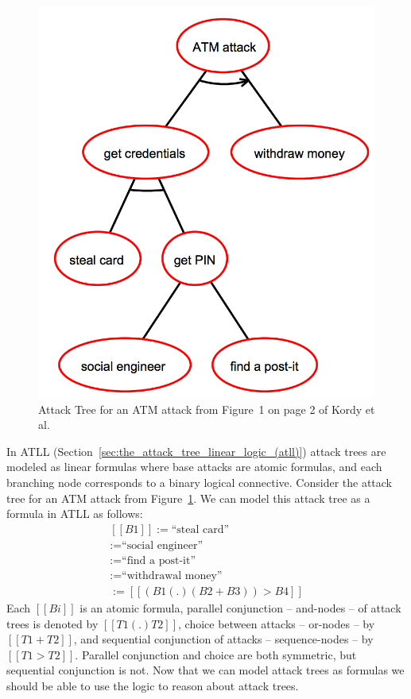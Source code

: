 \begin{figure}
  \vspace{-45px}
  \begin{center}
    \includegraphics[scale=0.210]{ATM-Tree1}
  \end{center}  
  \label{fig:atm-tree1}
  \caption{Attack Tree for an ATM attack from Figure~1 on page 2 of Kordy et al.~\cite{Kordy2017}}
  \vspace{-55px}
\end{figure}
In ATLL (Section~\ref{sec:the_attack_tree_linear_logic_(atll)}) attack
trees are modeled as linear formulas where base attacks are atomic
formulas, and each branching node corresponds to a binary logical
connective.  Consider the attack tree for an ATM attack from
Figure~\ref{fig:atm-tree1}.  We can model this attack tree as a
formula in ATLL as follows:
\[
\begin{array}{lll}
  [[B1]] := \text{``steal card''}\\
  [[B2]] := \text{``social engineer''}\\
  [[B3]] := \text{``find a post-it''}\\
  [[B4]] := \text{``withdrawal money''}\\
  [[T1]] := [[(B1 (.) (B2 + B3)) > B4]]
\end{array}
\]
Each $[[Bi]]$ is an atomic formula, parallel conjunction -- and-nodes
-- of attack trees is denoted by $[[T1 (.) T2]]$, choice between
attacks -- or-nodes -- by $[[T1 + T2]]$, and sequential conjunction of
attacks -- sequence-nodes -- by $[[T1 > T2]]$.  Parallel conjunction
and choice are both symmetric, but sequential conjunction is not.  Now
that we can model attack trees as formulas we should be able to use
the logic to reason about attack trees.


